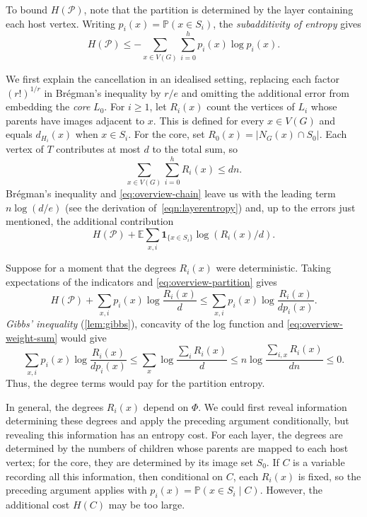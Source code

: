 \documentclass[10pt,a4paper]{amsart}
\numberwithin{equation}{section}
\theoremstyle{definition}
\theoremstyle{remark}
\begin{document}
To bound $H(\mathcal P)$, note that the partition is determined by the layer containing each host vertex. Writing $p_i(x)=\mathbb P(x\in S_i)$, the \emph{subadditivity of entropy} gives
\begin{equation}\label{eq:overview-partition}
    H(\mathcal P)\leq
    -\sum_{x\in V(G)}\sum_{i=0}^h p_i(x)\log p_i(x).
\end{equation}

We first explain the cancellation in an idealised setting, replacing
each factor $(r!)^{1/r}$ in Brégman's inequality by $r/e$ and omitting the additional error from embedding the \textit{core} $L_0$. For $i\ge1$, let $R_i(x)$ count the vertices of $L_i$ whose parents have images adjacent to $x$. 
This is defined for every $x\in V(G)$ and equals $d_{H_i}(x)$ when $x\in S_i$.
For the core, set $R_0(x)=|N_G(x)\cap S_0|$. Each vertex of $T$ contributes at most $d$ to the total sum, so
\begin{equation}\label{eq:overview-weight-sum}
    \sum_{x\in V(G)}\sum_{i=0}^h R_i(x)\leq dn.
\end{equation}
Br\'egman's inequality and \eqref{eq:overview-chain} leave us with
the leading term $n\log(d/e)$ (see the derivation of~\eqref{eqn:layerentropy}) and, up to the errors just mentioned,
the additional contribution
\[
    H(\mathcal P)+
    \mathbb E\sum_{x,i}
    \mathbf 1_{\{x\in S_i\}}\log( R_i(x)/d).
\]

Suppose for a moment that the degrees $R_i(x)$ were deterministic. Taking expectations of the indicators and \eqref{eq:overview-partition} gives
$$
H(\mathcal P)+\sum_{x,i}p_i(x)\log\frac{R_i(x)}d
\le \sum_{x,i}p_i(x)\log\frac{R_i(x)}{dp_i(x)}.
$$
\emph{Gibbs' inequality} (\cref{lem:gibbs}), concavity of the log function and \cref{eq:overview-weight-sum} would give
\[
    \sum_{x,i} p_i(x)\log\frac{R_i(x)}{dp_i(x)}\leq \sum_x\log\frac{\sum_iR_i(x)}{d}\leq n\log\frac{\sum_{i,x}R_i(x)}{dn}\leq 0.
\]
Thus, the degree terms would pay for the partition entropy.


In general, the degrees $R_i(x)$ depend on $\Phi$. We could first reveal information determining these degrees and apply the preceding argument conditionally, but revealing this information has an entropy cost. For each layer, the degrees are determined by the numbers of
children whose parents are mapped to each host vertex; for the
core, they are determined by its image set $S_0$. If $C$ is a variable recording all
this information, then conditional on $C$, each $R_i(x)$ is fixed, so the preceding argument applies with $p_i(x)=\mathbb P(x\in S_i\mid C)$. However, the additional cost $H(C)$ may be too large.
\end{document}
